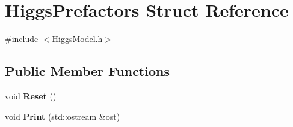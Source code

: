 \hypertarget{structHiggsPrefactors}{}\section{Higgs\+Prefactors Struct Reference}
\label{structHiggsPrefactors}


{\ttfamily \#include $<$Higgs\+Model.\+h$>$}

\subsection*{Public Member Functions}
\begin{DoxyCompactItemize}
\item 
\hypertarget{structHiggsPrefactors_ae4f75f164a669a105c808ad2853734b2}{}void {\bfseries Reset} ()\label{structHiggsPrefactors_ae4f75f164a669a105c808ad2853734b2}

\item 
\hypertarget{structHiggsPrefactors_aafa1b3b82a178e40bd7900b1575a9997}{}void {\bfseries Print} (std\+::ostream \&ost)\label{structHiggsPrefactors_aafa1b3b82a178e40bd7900b1575a9997}

\end{DoxyCompactItemize}
